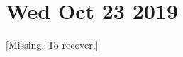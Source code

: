 \documentclass[main.tex]{subfiles}
\begin{document}
\section*{Wed Oct 23 2019}
[Missing. To recover.]
\end{document}
